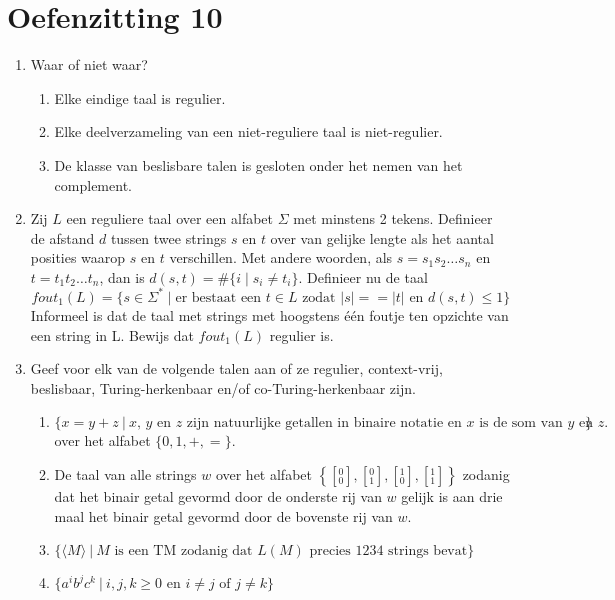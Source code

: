 \documentclass[a4paper]{article}
\newcommand{\twar}[2]{\left[ { }^{#1}_{#2} \right] }
\begin{document}
\section*{Oefenzitting 10}

\begin{enumerate}
   \item Waar of niet waar?
      \begin{enumerate}
         \item Elke eindige taal is regulier.
         \item Elke deelverzameling van een niet-reguliere taal is niet-regulier.
         \item De klasse van beslisbare talen is gesloten onder het nemen van het complement.
      \end{enumerate}
	\item Zij $L$ een reguliere taal over een alfabet $\Sigma$ met minstens 2 tekens. Definieer de afstand $d$ tussen twee strings $s$ en $t$ over van gelijke lengte als het aantal posities waarop $s$ en $t$ verschillen. Met andere woorden, als $s = s_1s_2\ldots s_n$ en $t = t_1t_2\ldots t_n$, dan is $d(s,t) = \#\{ i \mid s_i \neq t_i \}$. Definieer nu de taal
\[ fout_1(L) = \{s \in \Sigma^* \mid \text{er bestaat een $t \in L$ zodat $|s| == |t|$ en $d(s,t) \leq 1$} \}\]
Informeel is dat de taal met strings met hoogstens \'e\'en foutje ten opzichte van een string in L. Bewijs dat $fout_1(L)$ regulier is.
  \item Geef voor elk van de volgende talen aan of ze regulier, context-vrij, beslisbaar, Turing-herkenbaar en/of co-Turing-herkenbaar zijn.
			\begin{enumerate}
				\item $\{ x = y+z \  | \ \text{$x$, $y$ en $z$ zijn natuurlijke getallen in binaire notatie en $x$ is de som van $y$ en $z$.} \}$ over het alfabet $\{0,1,+,=\}$.
				\item De taal van alle strings $w$ over het alfabet $\left\{ \twar{0}{0}, \twar{0}{1}, \twar{1}{0}, \twar{1}{1} \right\}$ zodanig dat het binair getal gevormd door de onderste rij van $w$ gelijk is aan drie maal het binair getal gevormd door de bovenste rij van $w$. 
				\item $\{ \langle M \rangle \ | \ \text{$M$ is een TM zodanig dat $L(M)$ precies 1234 strings bevat} \}$ %
				\item $\{ a^ib^jc^k \ | \ \text{$i,j,k \geq 0$ en $i \neq j$ of $j \neq k$} \}$ 
			\end{enumerate}

\end{enumerate}
\end{document}
